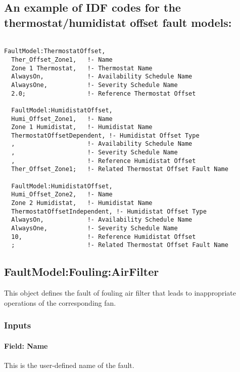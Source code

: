 \subsection{An example of IDF codes for the thermostat/humidistat offset fault models:}\label{an-example-of-idf-codes-for-the-thermostathumidistat-offset-fault-models}

\begin{lstlisting}

FaultModel:ThermostatOffset,
  Ther_Offset_Zone1,   !- Name
  Zone 1 Thermostat,   !- Thermostat Name
  AlwaysOn,            !- Availability Schedule Name
  AlwaysOne,           !- Severity Schedule Name
  2.0;                 !- Reference Thermostat Offset

  FaultModel:HumidistatOffset, 
  Humi_Offset_Zone1,   !- Name
  Zone 1 Humidistat,   !- Humidistat Name
  ThermostatOffsetDependent, !- Humidistat Offset Type
  ,                    !- Availability Schedule Name
  ,                    !- Severity Schedule Name
  ,                    !- Reference Humidistat Offset
  Ther_Offset_Zone1;   !- Related Thermostat Offset Fault Name

  FaultModel:HumidistatOffset, 
  Humi_Offset_Zone2,   !- Name
  Zone 2 Humidistat,   !- Humidistat Name
  ThermostatOffsetIndependent, !- Humidistat Offset Type
  AlwaysOn,            !- Availability Schedule Name
  AlwaysOne,           !- Severity Schedule Name
  10,                  !- Reference Humidistat Offset
  ;                    !- Related Thermostat Offset Fault Name
\end{lstlisting}

\subsection{FaultModel:Fouling:AirFilter}\label{faultmodelfoulingairfilter}

This object defines the fault of fouling air filter that leads to inappropriate operations of the corresponding fan.

\subsubsection{Inputs}\label{inputs-8-013}

\paragraph{Field: Name}\label{field-name-8-011}

This is the user-defined name of the fault.

